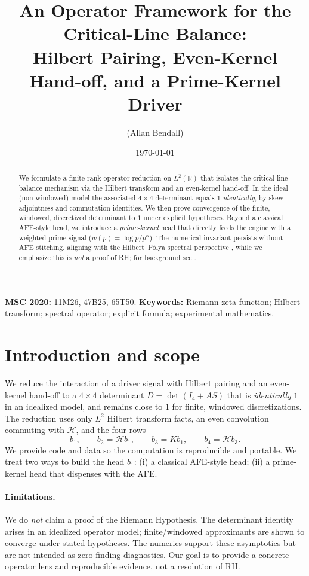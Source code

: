 \documentclass[11pt]{article}
\title{An Operator Framework for the Critical-Line Balance:\\
Hilbert Pairing, Even-Kernel Hand-off, and a Prime-Kernel Driver}
\author{(Allan Bendall)}
\date{\today}
\newcommand{\Hilb}{\mathcal H}
\begin{document}
\maketitle

\begin{abstract}
We formulate a finite-rank operator reduction on $L^2(\mathbb R)$ that isolates the
critical-line balance mechanism via the Hilbert transform and an even-kernel hand-off.
In the ideal (non-windowed) model the associated $4\times4$ determinant equals $1$ \emph{identically},
by skew-adjointness and commutation identities. We then prove convergence of the finite, windowed,
discretized determinant to $1$ under explicit hypotheses. Beyond a classical AFE-style head,
we introduce a \emph{prime-kernel} head that directly feeds the engine with a weighted prime signal
($w(p)=\log p/p^\alpha$). The numerical invariant persists without AFE stitching, aligning with the
Hilbert--P\'olya spectral perspective \cite{connes1999trace,berry1999riemann,bender2002riemann},
while we emphasize this is \emph{not} a proof of RH; for background see \cite{bombieri2000clay}.
\end{abstract}

\noindent\textbf{MSC 2020:} 11M26, 47B25, 65T50.\quad
\textbf{Keywords:} Riemann zeta function; Hilbert transform; spectral operator; explicit formula; experimental mathematics.

\section{Introduction and scope}
We reduce the interaction of a driver signal with Hilbert pairing and an even-kernel hand-off to
a $4\times4$ determinant $D=\det(I_4 + A S)$ that is \emph{identically} $1$ in an idealized model,
and remains close to $1$ for finite, windowed discretizations. The reduction uses only $L^2$ Hilbert
transform facts, an even convolution commuting with $\Hilb$, and the four rows
\begin{equation}\label{eq:rows}
b_1,\qquad b_2=\Hilb b_1,\qquad b_3=K b_1,\qquad b_4=\Hilb b_3.
\end{equation}
We provide code and data so the computation is reproducible and portable. We treat two ways to build the head $b_1$:
(i) a classical AFE-style head; (ii) a prime-kernel head that dispenses with the AFE.

\paragraph{Limitations.}
We do \emph{not} claim a proof of the Riemann Hypothesis. The determinant identity arises
in an idealized operator model; finite/windowed approximants are shown to converge under
stated hypotheses. The numerics support these asymptotics but are not intended as
zero-finding diagnostics. Our goal is to provide a concrete operator lens and reproducible
evidence, not a resolution of RH.
\end{document}
